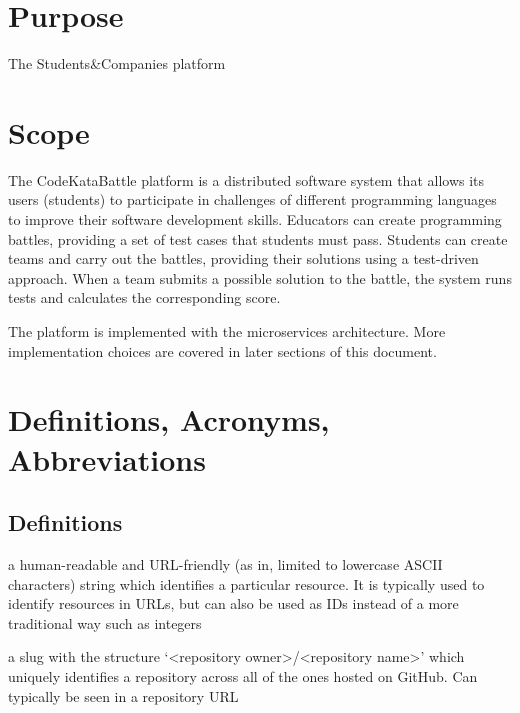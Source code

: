\section{Purpose}
The Students&Companies platform   
\section{Scope}
The CodeKataBattle platform is a distributed software system that allows its users (students) to participate in challenges of different programming languages to improve their software development skills.
Educators can create programming battles, providing a set of test cases that students must pass.
Students can create teams and carry out the battles, providing their solutions using a test-driven approach.
When a team submits a possible solution to the battle, the system runs tests and calculates the corresponding score.

The platform is implemented with the microservices architecture. 
More implementation choices are covered in later sections of this document.

\section{Definitions, Acronyms, Abbreviations}

\subsection{Definitions}
\begin{description}[leftmargin=0pt]
    \item[Slug:] a human-readable and URL-friendly (as in, limited to lowercase ASCII characters) string which
          identifies a particular resource. It is typically used to identify resources in URLs, but can also be used
          as IDs instead of a more traditional way such as integers
    \item[GitHub Repository Slug:] a slug with the structure `<repository owner>/<repository name>' which uniquely
          identifies a repository across all of the ones hosted on GitHub. Can typically be seen in a repository URL
\end{description}

